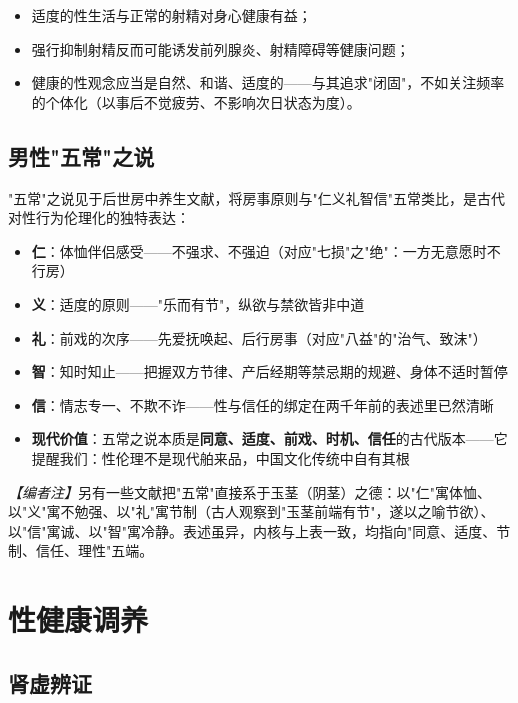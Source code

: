 \documentclass[12pt,a4paper,twoside]{ctexbook}
\begin{document}
\begin{itemize}
	\item 适度的性生活与正常的射精对身心健康有益；
	\item 强行抑制射精反而可能诱发前列腺炎、射精障碍等健康问题；
	\item 健康的性观念应当是自然、和谐、适度的——与其追求"闭固"，不如关注频率的个体化（以事后不觉疲劳、不影响次日状态为度）。
\end{itemize}

\subsection{男性"五常"之说}


"五常"之说见于后世房中养生文献，将房事原则与"仁义礼智信"五常类比，是古代对性行为伦理化的独特表达：

\begin{itemize}
	\item \textbf{仁}：体恤伴侣感受——不强求、不强迫（对应"七损"之"绝"：一方无意愿时不行房）
	\item \textbf{义}：适度的原则——"乐而有节"，纵欲与禁欲皆非中道
	\item \textbf{礼}：前戏的次序——先爱抚唤起、后行房事（对应"八益"的"治气、致沫"）
	\item \textbf{智}：知时知止——把握双方节律、产后经期等禁忌期的规避、身体不适时暂停
	\item \textbf{信}：情志专一、不欺不诈——性与信任的绑定在两千年前的表述里已然清晰
	\item \textbf{现代价值}：五常之说本质是\textbf{同意、适度、前戏、时机、信任}的古代版本——它提醒我们：性伦理不是现代舶来品，中国文化传统中自有其根
\end{itemize}

\vspace{0.5em}
\noindent\textit{【编者注】}另有一些文献把"五常"直接系于玉茎（阴茎）之德：以"仁"寓体恤、以"义"寓不勉强、以"礼"寓节制（古人观察到"玉茎前端有节"，遂以之喻节欲）、以"信"寓诚、以"智"寓冷静。表述虽异，内核与上表一致，均指向"同意、适度、节制、信任、理性"五端。

\section{性健康调养}


\subsection{肾虚辨证}
\end{document}
